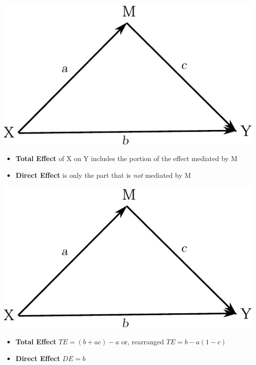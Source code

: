 \documentclass[xcolor=dvipsnames]{beamer}
\begin{document}
\begin{frame}{}
\includegraphics{arrow_diag_2.pdf}
\begin{itemize}
	\item \textbf{Total Effect} of X on Y includes the portion of the effect
	mediated by M
	\item \textbf{Direct Effect} is only the part that is \textit{not} mediated
	by M
\end{itemize} 
\end{frame}

\begin{frame}{}
\includegraphics{arrow_diag_2.pdf}
\begin{itemize}
	\item \textbf{Total Effect} $TE = (b + ac) - a$ or, rearranged $TE = b - a(1
	- c)$
	\item \textbf{Direct Effect} $DE = b$
\end{itemize} 
\end{frame}
\end{document}
